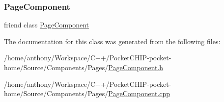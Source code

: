 \subsubsection{\texorpdfstring{Page\+Component}{PageComponent}}
{\footnotesize\ttfamily friend class \mbox{\hyperlink{classPageComponent}{Page\+Component}}\hspace{0.3cm}{\ttfamily [friend]}}



The documentation for this class was generated from the following files\+:\begin{DoxyCompactItemize}
\item 
/home/anthony/\+Workspace/\+C++/\+Pocket\+C\+H\+I\+P-\/pocket-\/home/\+Source/\+Components/\+Pages/\mbox{\hyperlink{PageComponent_8h}{Page\+Component.\+h}}\item 
/home/anthony/\+Workspace/\+C++/\+Pocket\+C\+H\+I\+P-\/pocket-\/home/\+Source/\+Components/\+Pages/\mbox{\hyperlink{PageComponent_8cpp}{Page\+Component.\+cpp}}\end{DoxyCompactItemize}
